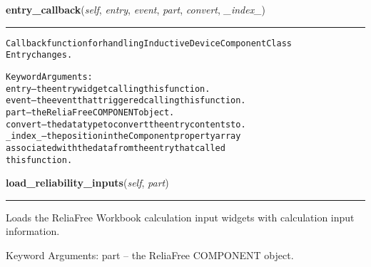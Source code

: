     \vspace{0.5ex}

\hspace{.8\funcindent}\begin{boxedminipage}{\funcwidth}

    \raggedright \textbf{entry\_callback}(\textit{self}, \textit{entry}, \textit{event}, \textit{part}, \textit{convert}, \textit{\_index\_})

    \vspace{-1.5ex}

    \rule{\textwidth}{0.5\fboxrule}
\setlength{\parskip}{2ex}
\begin{alltt}
Callback function for handling Inductive Device Component Class
Entry changes.

Keyword Arguments:
  entry -- the entry widget calling this function.
  event -- the event that triggered calling this function.
   part -- the ReliaFree COMPONENT object.
convert -- the data type to convert the entry contents to.
\_index\_ -- the position in the Component property array
           associated with the data from the entry that called
           this function.
\end{alltt}

\setlength{\parskip}{1ex}
    \end{boxedminipage}

    \label{reliafree:inductors:inductor:Inductor:load_reliability_inputs}

    \vspace{0.5ex}

\hspace{.8\funcindent}\begin{boxedminipage}{\funcwidth}

    \raggedright \textbf{load\_reliability\_inputs}(\textit{self}, \textit{part})

    \vspace{-1.5ex}

    \rule{\textwidth}{0.5\fboxrule}
\setlength{\parskip}{2ex}
    Loads the ReliaFree Workbook calculation input widgets with calculation
    input information.

    Keyword Arguments: part -- the ReliaFree COMPONENT object.

\setlength{\parskip}{1ex}
    \end{boxedminipage}

